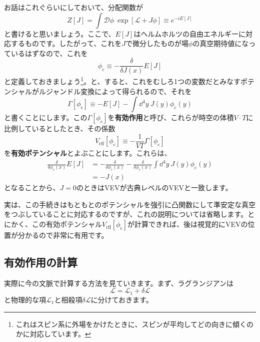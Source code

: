 \documentclass[unicode,a4paper,11pt]{ltjsarticle}
\theoremstyle{definition}
\begin{document}
お話はこれぐらいにしておいて、分配関数が
\begin{equation}
   Z[J]
   =
   \int\mathcal{D}\phi\
   \exp
   \left[
      \mathcal{L}+J\phi
      \right]
   \equiv
   e^{-i E[J]}
\end{equation}
と書けると思いましょう。ここで、$E[J]$はヘルムホルツの自由エネルギーに対応するものです。したがって、これを$J$で微分したものが場$\phi$の真空期待値になっているはずなので、これを
\begin{equation}
   \phi_{\mathrm{c}}
   \equiv
   -
   \frac{\delta}{\delta J(x)}E[J]
\end{equation}
と定義しておきましょう\footnote{
   これはスピン系に外場をかけたときに、スピンが平均してどの向きに傾くのかに対応しています。
}。と、すると、これをむしろ1つの変数だとみなすポテンシャルがルジャンドル変換によって得られるので、それを
\begin{equation}
   \Gamma[\phi_{\mathrm{c}}]
   \equiv
   -
   E[J]
   -
   \int\dd^4 y\
   J(y)\phi_{\mathrm{c}}(y)
\end{equation}
と書くことにします。この$\Gamma[\phi_{\mathrm{c}}]$を\textbf{有効作用}と呼び、これらが時空の体積$V\cdot T$に比例しているとしたとき、その係数
\begin{equation}
   V_{\mathrm{rff}}[\phi_{\mathrm{c}}]
   \equiv
   -\frac{1}{VT}\Gamma[\phi_{\mathrm{c}}]
\end{equation}
を\textbf{有効ポテンシャル}とよぶことにします。これらは、
\begin{align}
   \frac{\delta}{\delta \phi_{\mathrm{c}}(x)}E[J]
    & =
   -
   \frac{\delta}{\delta \phi_{\mathrm{c}}(x)}
   -
   \frac{\delta}{\delta \phi_{\mathrm{c}}(x)}
   \int\dd^4 y\
   J(y)\phi_{\mathrm{c}}(y)
   \nonumber
   \\
    & =
   -J(x)
\end{align}
となることから、$J=0$のときはVEVが古典レベルのVEVと一致します。

実は、この手続きはもともとのポテンシャルを強引に凸関数にして準安定な真空をつぶしていることに対応するのですが、これの説明については省略します。とにかく、この有効ポテンシャル$V_{\mathrm{rff}}[\phi_{\mathrm{c}}]$が計算できれば、後は視覚的にVEVの位置が分かるので非常に有用です。


\subsection{有効作用の計算}

実際に今の文脈で計算する方法を見ていきます。まず、ラグランジアンは
\begin{equation}
   \mathcal{L}
   =
   \mathcal{L}_{1}
   +
   \delta\mathcal{L}
\end{equation}
と物理的な項$\mathcal{L}_{1}$と相殺項$\delta\mathcal{L}$に分けておきます。
\end{document}
